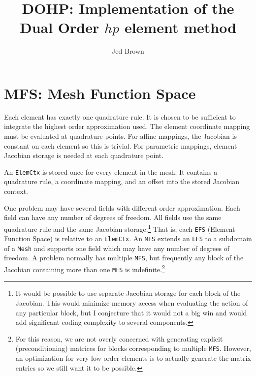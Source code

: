 \documentclass[a4paper]{article}
\title{DOHP: Implementation of the Dual Order $hp$ element method}
\author{Jed Brown}
\newcommand{\struct}[1]{\texttt{#1}}
\newcommand{\trl}[1]{\texttt{#1}}
\begin{document}
\maketitle

\section{MFS: Mesh Function Space}
Each element has exactly one quadrature rule.  It is chosen to be sufficient to
integrate the highest order approximation used.  The element coordinate mapping
must be evaluated at quadrature points.  For affine mappings, the Jacobian is
constant on each element so this is trivial.  For parametric mappings, element
Jacobian storage is needed at each quadrature point.

An \struct{ElemCtx} is stored once for every element in the mesh. It contains a
quadrature rule, a coordinate mapping, and an offset into the stored Jacobian
context.

One problem may have several fields with different order approximation.  Each
field can have any number of degrees of freedom.  All fields use the same
quadrature rule and the same Jacobian storage.\footnote{It would be possible to
  use separate Jacobian storage for each block of the Jacobian.  This would
  minimize memory access when evaluating the action of any particular block, but
  I conjecture that it would not a big win and would add significant coding
  complexity to several components.}  That is, each \trl{EFS} (Element Function
Space) is relative to an \struct{ElemCtx}.  An \trl{MFS} extends an \trl{EFS} to
a subdomain of a \trl{Mesh} and supports one field which may have any number of
degrees of freedom.  A problem normally has multiple \trl{MFS}, but frequently
any block of the Jacobian containing more than one \trl{MFS} is
indefinite.\footnote{For this reason, we are not overly concerned with
  generating explicit (preconditioning) matrices for blocks corresponding to
  multiple \trl{MFS}.  However, an optimization for very low order elements is
  to actually generate the matrix entries so we still want it to be possible.}
\end{document}
